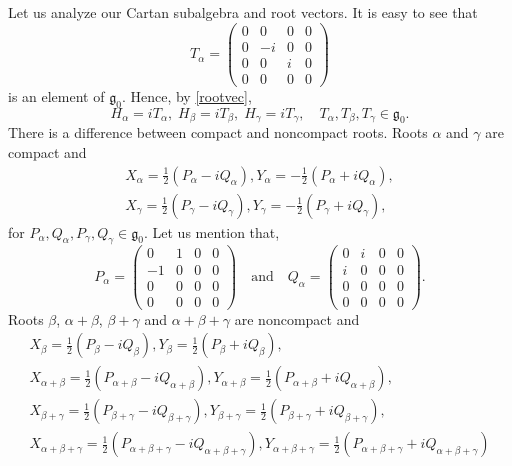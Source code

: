 \documentclass[twoside,a4paper,12pt]{article}
\newcommand{\go}{\ensuremath{{\mathfrak g}_0}}
\theoremstyle{definition}
\begin{document}
Let us analyze our Cartan subalgebra and root vectors. It is easy to see that
\begin{equation*}
	T_\alpha=\begin{pmatrix}0&0&0&0\\0&-i&0&0\\0&0&i&0\\0&0&0&0\end{pmatrix}
\end{equation*}
is an element of \go. Hence, by \eqref{rootvec},
\begin{equation}\label{xyagp}
	H_\alpha=iT_\alpha,\;H_\beta=iT_\beta,\;H_\gamma=iT_\gamma,\quad
	T_\alpha,T_\beta,T_\gamma\in\go.
\end{equation}
There is a difference between compact and noncompact roots. Roots $\alpha$ and
$\gamma$ are compact and
\begin{align}
	X_\alpha=\frac12\left(P_\alpha-iQ_\alpha\right),
	Y_\alpha=-\frac12\left(P_\alpha+iQ_\alpha\right),\\
	X_\gamma=\frac12\left(P_\gamma-iQ_\gamma\right),
	Y_\gamma=-\frac12\left(P_\gamma+iQ_\gamma\right),
\end{align}
for $P_\alpha,Q_\alpha,P_\gamma,Q_\gamma\in\go$. Let us mention that,
\begin{equation*}
	P_\alpha=\begin{pmatrix}0&1&0&0\\-1&0&0&0\\0&0&0&0\\0&0&0&0\end{pmatrix}
	\quad\mbox{and}\quad
	Q_\alpha=\begin{pmatrix}0&i&0&0\\i&0&0&0\\0&0&0&0\\0&0&0&0\end{pmatrix}.
\end{equation*}
Roots $\beta$, $\alpha+\beta$, $\beta+\gamma$ and $\alpha+\beta+\gamma$ are
noncompact and
\begin{gather}
	X_\beta=\frac12\left(P_\beta-iQ_\beta\right),
	Y_\beta=\frac12\left(P_\beta+iQ_\beta\right),\\
	X_{\alpha+\beta}=\frac12\left(P_{\alpha+\beta}-iQ_{\alpha+\beta}\right),
	Y_{\alpha+\beta}=\frac12\left(P_{\alpha+\beta}+iQ_{\alpha+\beta}\right),\\
	X_{\beta+\gamma}=\frac12\left(P_{\beta+\gamma}-iQ_{\beta+\gamma}\right),
	Y_{\beta+\gamma}=\frac12\left(P_{\beta+\gamma}+iQ_{\beta+\gamma}\right),\\
	X_{\alpha+\beta+\gamma}=
		\frac12\left(P_{\alpha+\beta+\gamma}-iQ_{\alpha+\beta+\gamma}\right),
	Y_{\alpha+\beta+\gamma}=\label{xyagz}
		\frac12\left(P_{\alpha+\beta+\gamma}+iQ_{\alpha+\beta+\gamma}\right)
\end{gather}
\end{document}
